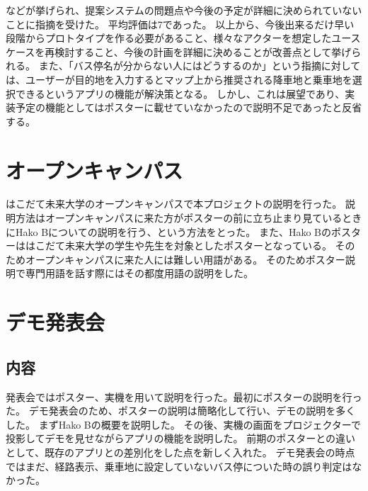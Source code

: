 \documentclass[openany,11pt,papersize]{jsbook}
\begin{document}
\begin{description}
\begin{itemize}
\end{itemize}
などが挙げられ、提案システムの問題点や今後の予定が詳細に決められていないことに指摘を受けた。
平均評価は7であった。
以上から、今後出来るだけ早い段階からプロトタイプを作る必要があること、様々なアクターを想定したユースケースを再検討すること、今後の計画を詳細に決めることが改善点として挙げられる。
また、「バス停名が分からない人にはどうするのか」という指摘に対しては、ユーザーが目的地を入力するとマップ上から推奨される降車地と乗車地を選択できるというアプリの機能が解決策となる。
しかし、これは展望であり、実装予定の機能としてはポスターに載せていなかったので説明不足であったと反省する。


\end{description}

\section{オープンキャンパス}
はこだて未来大学のオープンキャンパスで本プロジェクトの説明を行った。
説明方法はオープンキャンパスに来た方がポスターの前に立ち止まり見ているときにHako Bについての説明を行う、という方法をとった。
また、Hako Bのポスターははこだて未来大学の学生や先生を対象としたポスターとなっている。
そのためオープンキャンパスに来た人には難しい用語がある。
そのためポスター説明で専門用語を話す際にはその都度用語の説明をした。


\section{デモ発表会}
\subsection{内容}
発表会ではポスター、実機を用いて説明を行った。最初にポスターの説明を行った。
デモ発表会のため、ポスターの説明は簡略化して行い、デモの説明を多くした。
まずHako Bの概要を説明した。
その後、実機の画面をプロジェクターで投影してデモを見せながらアプリの機能を説明した。
前期のポスターとの違いとして、既存のアプリとの差別化をした点を新しく入れた。
デモ発表会の時点ではまだ、経路表示、乗車地に設定していないバス停についた時の誤り判定はなかった。
\end{document}

